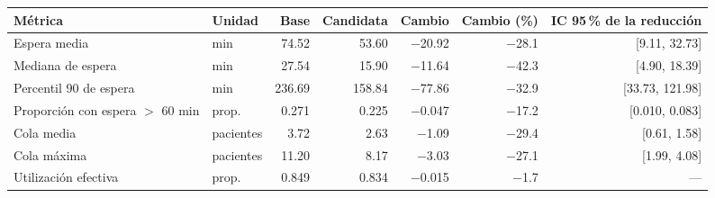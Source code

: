 \begin{tabular}{llrrrrr}
\toprule
Métrica & Unidad & Base & Candidata & Cambio & Cambio (\%) & IC 95\,\% de la reducción \\
\midrule
Espera media & min & 74.52 & 53.60 & $-$20.92 & $-$28.1 & [9.11, 32.73] \\
Mediana de espera & min & 27.54 & 15.90 & $-$11.64 & $-$42.3 & [4.90, 18.39] \\
Percentil 90 de espera & min & 236.69 & 158.84 & $-$77.86 & $-$32.9 & [33.73, 121.98] \\
Proporción con espera $>$ 60 min & prop. & 0.271 & 0.225 & $-$0.047 & $-$17.2 & [0.010, 0.083] \\
Cola media & pacientes & 3.72 & 2.63 & $-$1.09 & $-$29.4 & [0.61, 1.58] \\
Cola máxima & pacientes & 11.20 & 8.17 & $-$3.03 & $-$27.1 & [1.99, 4.08] \\
Utilización efectiva & prop. & 0.849 & 0.834 & $-$0.015 & $-$1.7 & --- \\
\bottomrule
\end{tabular}
